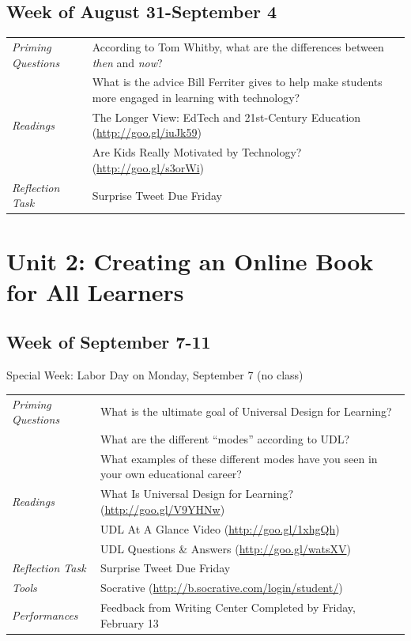 \documentclass{tufte-handout}
\newcommand{\tabpq}{\faQuestionSign\medspace\textit{Priming Questions}}
\newcommand{\tabread}{\faBook\medspace\textit{Readings}}
\newcommand{\tabtools}{\faWrench\medspace\textit{Tools}}
\newcommand{\tabtweet}{\faLightbulb\medspace\textit{Reflection Task} & Surprise Tweet Due Friday \\}
\newcommand{\tabperformance}{\faTasks\medspace\textit{Performances}}
\newenvironment{tabsched}
	{\small
	\begin{tabular}{p{1.5in}p{5in}}
	\toprule}
	{\bottomrule
	\end{tabular}
	\normalsize}
\newenvironment{specweek}
	{\begin{center}
		\fontseries{b} \faBullhorn \medspace Special Week: }
		{\medspace \faBullhorn \fontseries{m}
	\end{center}}
\newcommand{\weekthree}{August 31-September 4}
\newcommand{\weekfour}{September 7-11}
\newcommand{\laborday}{Labor Day on Monday, September 7 (no class)}
\begin{document}
\begin{fullwidth}
\subsection{Week of \weekthree}

\begin{tabsched}
	\tabpq & According to Tom Whitby, what are the differences between \textit{then} and \textit{now}? \\
	& What is the advice Bill Ferriter gives to help make students more engaged in learning with technology? \\
	\midrule
	\tabread & The Longer View: EdTech and 21st-Century Education (\url{http://goo.gl/iuJk59}) \\
	& Are Kids Really Motivated by Technology? (\url{http://goo.gl/s3orWi}) \\
	\midrule
	\tabtweet
\end{tabsched}

\section{Unit 2: Creating an Online Book for All Learners}

\subsection{Week of \weekfour}

\begin{specweek}\laborday\end{specweek}

\begin{tabsched}
	\tabpq & What is the ultimate goal of Universal Design for Learning? \\
	& What are the different \enquote{modes} according to UDL? \\
	& What examples of these different modes have you seen in your own educational career? \\
	\midrule
	\tabread & What Is Universal Design for Learning? (\url{http://goo.gl/V9YHNw}) \\
	& UDL At A Glance Video (\url{http://goo.gl/1xhgQh}) \\
	& UDL Questions \& Answers (\url{http://goo.gl/watsXV}) \\
	\midrule
	\tabtweet
	\midrule
	\tabtools & Socrative (\url{http://b.socrative.com/login/student/}) \\
	\midrule
	\tabperformance & Feedback from Writing Center Completed by Friday, February 13 \\
\end{tabsched}
\newpage

\end{fullwidth}
\end{document}
